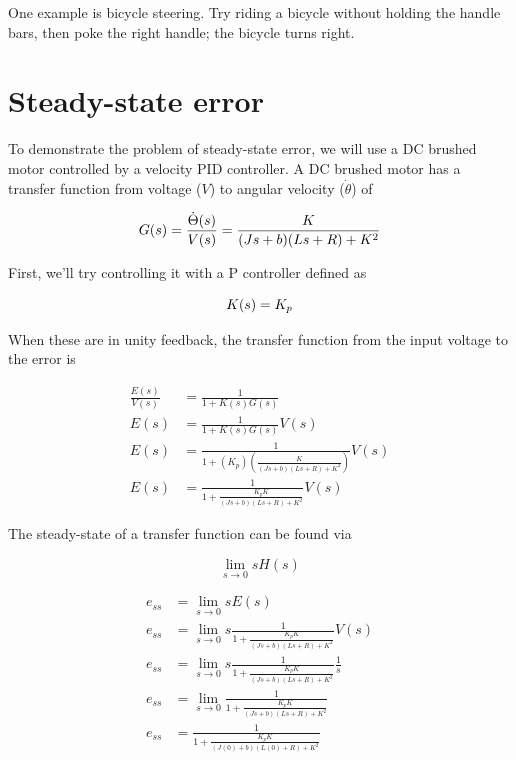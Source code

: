 \documentclass[10pt,conference,compsoc]{IEEEtran}
\begin{document}
\noindent One example is bicycle steering. Try riding a bicycle without holding
the handle bars, then poke the right handle; the bicycle turns right.

\section{Steady-state error}

\noindent To demonstrate the problem of steady-state error, we will use a DC
brushed motor controlled by a velocity PID controller. A DC brushed motor has
a transfer function from voltage ($V$) to angular velocity ($\dot{\theta}$) of

\begin{equation}
  G(s) = \frac{\dot{\Theta}(s)}{V(s)} = \frac{K}{(Js+b)(Ls+R)+K^2} \\
\end{equation}

\noindent First, we'll try controlling it with a P controller defined as

\begin{equation*}
  K(s) = K_p \\
\end{equation*}

\noindent When these are in unity feedback, the transfer function from the input
voltage to the error is

\begin{align*}
  \frac{E(s)}{V(s)} &= \frac{1}{1 + K(s)G(s)} \\
  E(s) &= \frac{1}{1 + K(s)G(s)} V(s) \\
  E(s) &= \frac{1}{1 + (K_p) \left(\frac{K}{(Js+b)(Ls+R)+K^2}\right)} V(s) \\
  E(s) &= \frac{1}{1 + \frac{K_p K}{(Js+b)(Ls+R)+K^2}} V(s)
\end{align*}

The steady-state of a transfer function can be found via

\begin{equation}
  \lim_{s\to0} sH(s)
\end{equation}

\begin{align*}
  e_{ss} &= \lim_{s\to0} sE(s) \\
  e_{ss} &= \lim_{s\to0} s \frac{1}{1 + \frac{K_p K}{(Js+b)(Ls+R)+K^2}} V(s) \\
  e_{ss} &= \lim_{s\to0} s \frac{1}{1 + \frac{K_p K}{(Js+b)(Ls+R)+K^2}}
    \frac{1}{s} \\
  e_{ss} &= \lim_{s\to0} \frac{1}{1 + \frac{K_p K}{(Js+b)(Ls+R)+K^2}} \\
  e_{ss} &= \frac{1}{1 + \frac{K_p K}{(J(0)+b)(L(0)+R)+K^2}}
\end{align*}
\end{document}
